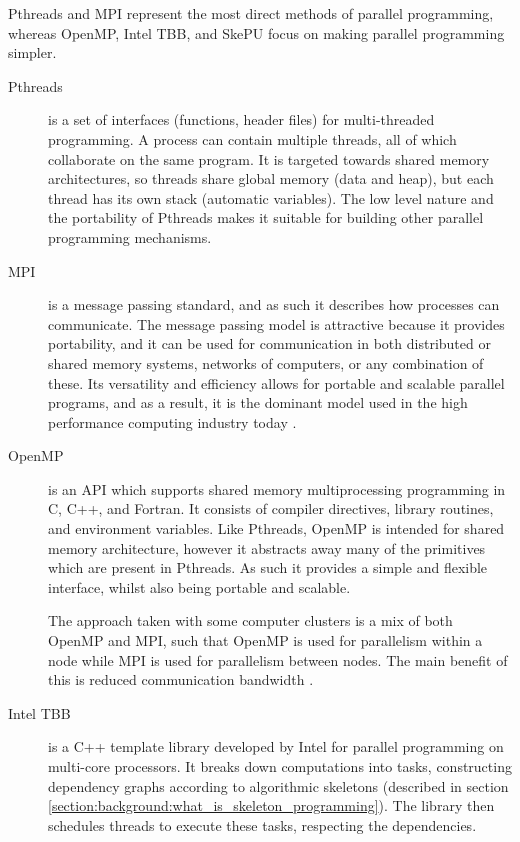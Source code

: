 Pthreads and MPI represent the most direct methods of parallel programming, whereas OpenMP, Intel TBB, and SkePU focus on making parallel programming simpler. 

\begin{description}
\item[Pthreads] is a set of interfaces (functions, header files) for multi-threaded programming. A process can contain multiple threads, all of which collaborate on the same program. It is targeted towards shared memory architectures, so threads share global memory (data and heap), but each thread has its own stack (automatic variables). The low level nature and the portability of Pthreads makes it suitable for building other parallel programming mechanisms.

\item[MPI] is a message passing standard, and as such it describes how processes can communicate. The message passing model is attractive because it provides portability, and it can be used for communication in both distributed or shared memory systems, networks of computers, or any combination of these. Its versatility and efficiency allows for portable and scalable parallel programs, and as a result, it is the dominant model used in the high performance computing industry today \cite{mpi}. 

\item[OpenMP] is an API which supports shared memory multiprocessing programming in C, C++, and Fortran. It consists of compiler directives, library routines, and environment variables. Like Pthreads, OpenMP is intended for shared memory architecture, however it abstracts away many of the primitives which are present in Pthreads. As such it provides a simple and flexible interface, whilst also being portable and scalable. 

The approach taken with some computer clusters is a mix of both OpenMP and MPI, such that OpenMP is used for parallelism within a node while MPI is used for parallelism between nodes. The main benefit of this is reduced communication bandwidth \cite{mixed_openmp_mpi}.

\item[Intel TBB] is a C++ template library developed by Intel for parallel programming on multi-core processors. It breaks down computations into tasks, constructing dependency graphs according to algorithmic skeletons (described in section \ref{section:background:what_is_skeleton_programming}). The library then schedules threads to execute these tasks, respecting the dependencies.


\end{description}
